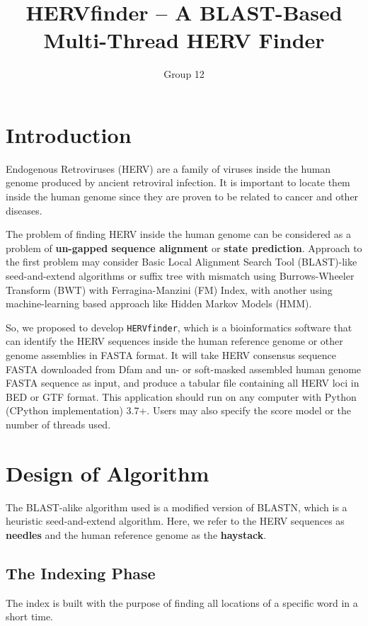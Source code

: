 \documentclass[10pt,final,journal,twocolumn,a4paper]{IEEEtran}
\title{HERVfinder -- A BLAST-Based Multi-Thread HERV Finder}
\author{Group 12}
\begin{document}
\sloppy{}\flushbottom\maketitle\tableofcontents
\section{Introduction}

 Endogenous Retroviruses (HERV) are a family of viruses inside the human genome produced by ancient retroviral infection. It is important to locate them inside the human genome since they are proven to be related to cancer and other diseases.

The problem of finding HERV inside the human genome can be considered as a problem of \textbf{un-gapped sequence alignment} or \textbf{state prediction}. Approach to the first problem may consider Basic Local Alignment Search Tool (BLAST)-like seed-and-extend algorithms or suffix tree with mismatch using Burrows-Wheeler Transform (BWT) with Ferragina-Manzini (FM) Index, with another using machine-learning based approach like Hidden Markov Models (HMM).

So, we proposed to develop \verb|HERVfinder|, which is a bioinformatics software that can identify the HERV sequences inside the human reference genome or other genome assemblies in FASTA format. It will take HERV consensus sequence FASTA downloaded from Dfam and un- or soft-masked assembled human genome FASTA sequence as input, and produce a tabular file containing all HERV loci in BED or GTF format. This application should run on any computer with Python (CPython implementation) 3.7+. Users may also specify the score model or the number of threads used.


\section{Design of Algorithm}

The BLAST-alike algorithm used is a modified version of BLASTN, which is a heuristic seed-and-extend algorithm. Here, we refer to the HERV sequences as \textbf{needles} and the human reference genome as the \textbf{haystack}.

\subsection{The \textbf{Indexing} Phase}

The index is built with the purpose of finding all locations of a specific word in a short time.
\end{document}
